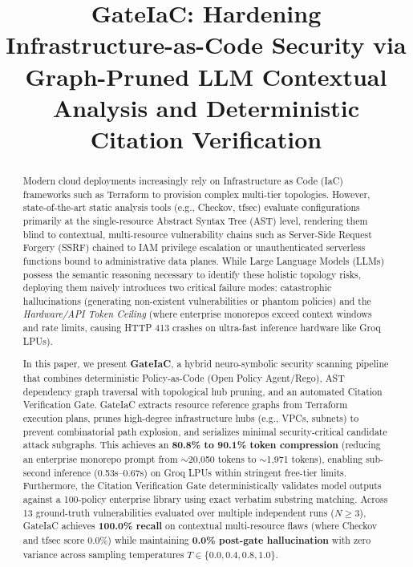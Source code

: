 \documentclass[conference]{IEEEtran}
\begin{document}
\title{GateIaC: Hardening Infrastructure-as-Code Security via Graph-Pruned LLM Contextual Analysis and Deterministic Citation Verification}

\author{
}

\maketitle

\begin{abstract}
Modern cloud deployments increasingly rely on Infrastructure as Code (IaC) frameworks such as Terraform to provision complex multi-tier topologies. However, state-of-the-art static analysis tools (e.g., Checkov, tfsec) evaluate configurations primarily at the single-resource Abstract Syntax Tree (AST) level, rendering them blind to contextual, multi-resource vulnerability chains such as Server-Side Request Forgery (SSRF) chained to IAM privilege escalation or unauthenticated serverless functions bound to administrative data planes. While Large Language Models (LLMs) possess the semantic reasoning necessary to identify these holistic topology risks, deploying them naively introduces two critical failure modes: catastrophic hallucinations (generating non-existent vulnerabilities or phantom policies) and the \textit{Hardware/API Token Ceiling} (where enterprise monorepos exceed context windows and rate limits, causing HTTP 413 crashes on ultra-fast inference hardware like Groq LPUs).

In this paper, we present \textbf{GateIaC}, a hybrid neuro-symbolic security scanning pipeline that combines deterministic Policy-as-Code (Open Policy Agent/Rego), AST dependency graph traversal with topological hub pruning, and an automated Citation Verification Gate. GateIaC extracts resource reference graphs from Terraform execution plans, prunes high-degree infrastructure hubs (e.g., VPCs, subnets) to prevent combinatorial path explosion, and serializes minimal security-critical candidate attack subgraphs. This achieves an \textbf{80.8\% to 90.1\% token compression} (reducing an enterprise monorepo prompt from $\sim$20,050 tokens to $\sim$1,971 tokens), enabling sub-second inference (0.53s--0.67s) on Groq LPUs within stringent free-tier limits. Furthermore, the Citation Verification Gate deterministically validates model outputs against a 100-policy enterprise library using exact verbatim substring matching. Across 13 ground-truth vulnerabilities evaluated over multiple independent runs ($N \ge 3$), GateIaC achieves \textbf{100.0\% recall} on contextual multi-resource flaws (where Checkov and tfsec score 0.0\%) while maintaining \textbf{0.0\% post-gate hallucination} with zero variance across sampling temperatures $T \in \{0.0, 0.4, 0.8, 1.0\}$.
\end{abstract}
\end{document}
